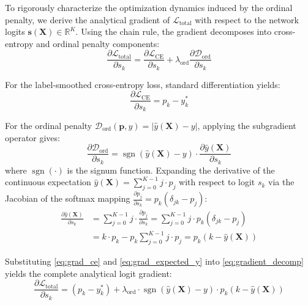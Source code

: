 \documentclass[10pt,journal]{IEEEtran}
\begin{document}
To rigorously characterize the optimization dynamics induced by the ordinal penalty, we derive the analytical gradient of $\mathcal{L}_{\text{total}}$ with respect to the network logits $\mathbf{s}(\mathbf{X}) \in \mathbb{R}^K$. Using the chain rule, the gradient decomposes into cross-entropy and ordinal penalty components:
\begin{equation}
\frac{\partial \mathcal{L}_{\text{total}}}{\partial s_k} = \frac{\partial \mathcal{L}_{\text{CE}}}{\partial s_k} + \lambda_{\text{ord}} \frac{\partial \mathcal{D}_{\text{ord}}}{\partial s_k}
\label{eq:gradient_decomp}
\end{equation}

For the label-smoothed cross-entropy loss, standard differentiation yields:
\begin{equation}
\frac{\partial \mathcal{L}_{\text{CE}}}{\partial s_k} = p_k - y_k^*
\label{eq:grad_ce}
\end{equation}

For the ordinal penalty $\mathcal{D}_{\text{ord}}(\mathbf{p}, y) = |\hat{y}(\mathbf{X}) - y|$, applying the subgradient operator gives:
\begin{equation}
\frac{\partial \mathcal{D}_{\text{ord}}}{\partial s_k} = \operatorname{sgn}(\hat{y}(\mathbf{X}) - y) \cdot \frac{\partial \hat{y}(\mathbf{X})}{\partial s_k}
\label{eq:grad_ord_chain}
\end{equation}
where $\operatorname{sgn}(\cdot)$ is the signum function. Expanding the derivative of the continuous expectation $\hat{y}(\mathbf{X}) = \sum_{j=0}^{K-1} j \cdot p_j$ with respect to logit $s_k$ via the Jacobian of the softmax mapping $\frac{\partial p_j}{\partial s_k} = p_k(\delta_{jk} - p_j)$:
\begin{align}
\frac{\partial \hat{y}(\mathbf{X})}{\partial s_k} &= \sum_{j=0}^{K-1} j \cdot \frac{\partial p_j}{\partial s_k} = \sum_{j=0}^{K-1} j \cdot p_k (\delta_{jk} - p_j) \nonumber \\
&= k \cdot p_k - p_k \sum_{j=0}^{K-1} j \cdot p_j = p_k \left( k - \hat{y}(\mathbf{X}) \right)
\label{eq:grad_expected_y}
\end{align}

Substituting \eqref{eq:grad_ce} and \eqref{eq:grad_expected_y} into \eqref{eq:gradient_decomp} yields the complete analytical logit gradient:
\begin{equation}
\frac{\partial \mathcal{L}_{\text{total}}}{\partial s_k} = (p_k - y_k^*) + \lambda_{\text{ord}} \cdot \operatorname{sgn}(\hat{y}(\mathbf{X}) - y) \cdot p_k \left( k - \hat{y}(\mathbf{X}) \right)
\label{eq:full_gradient}
\end{equation}
\end{document}
